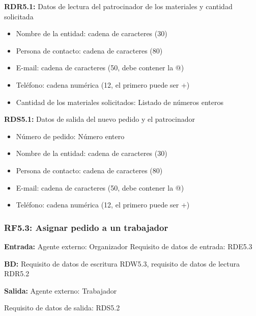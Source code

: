 \textbf{RDR5.1:} Datos de lectura del patrocinador de los materiales y cantidad solicitada
\begin{itemize}
	\item Nombre de la entidad: cadena de caracteres (30)
	\item Persona de contacto: cadena de caracteres (80)
	\item E-mail: cadena de caracteres (50, debe contener la @)
	\item Teléfono: cadena numérica (12, el primero puede ser +)
\newline
	\item Cantidad de los materiales solicitados: Listado de números enteros
\end{itemize}

\textbf{RDS5.1:} Datos de salida del nuevo pedido y el patrocinador
\begin{itemize}
	\item Número de pedido: Número entero
\newline
	\item Nombre de la entidad: cadena de caracteres (30)
	\item Persona de contacto: cadena de caracteres (80)
    \item E-mail: cadena de caracteres (50, debe contener la @)
    \item Teléfono: cadena numérica (12, el primero puede ser +)
\end{itemize}

\subsubsection{RF5.3: Asignar pedido a un trabajador}
\textbf{Entrada:} Agente externo: Organizador        Requisito de datos de entrada: RDE5.3

\textbf{BD:} Requisito de datos de escritura RDW5.3, requisito de datos de lectura RDR5.2

\textbf{Salida:} Agente externo: Trabajador

Requisito de datos de salida: RDS5.2

